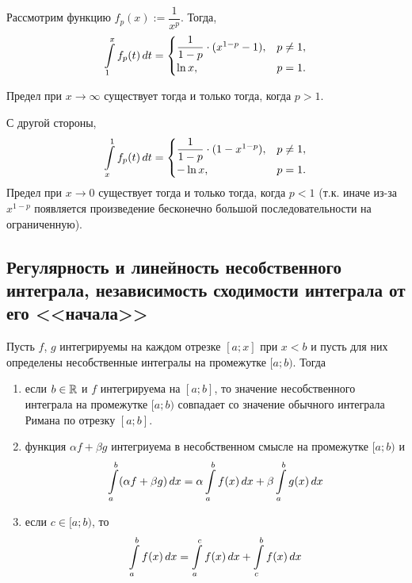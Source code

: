 \documentclass[a4paper]{article}
\theoremstyle{named}
\renewcommand{\int}{\intop}
\begin{document}
    	Рассмотрим функцию $f_p(x) := \dfrac{1}{x^p}$. Тогда,
    	\begin{equation*}
    		\int_1^x f_p(t) \dd t = \begin{cases}
    			\dfrac{1}{1 - p} \cdot (x^{1 - p} - 1), &p \neq 1, \\
    			\ln x, &p = 1.
    		\end{cases}
    	\end{equation*}

    	Предел при $x \to \infty$ существует тогда и только тогда, когда $p > 1$.

    	С другой стороны,
    	\begin{equation*}
    		\int_x^1 f_p(t) \dd t = \begin{cases}
    			\dfrac{1}{1 - p} \cdot (1 - x^{1 - p}), &p \neq 1, \\
    			-\ln x, &p = 1.
    		\end{cases}
    	\end{equation*}
    	Предел при $x \to 0$ существует тогда и только тогда, когда $p < 1$ (т.к. иначе из-за $x^{1 - p}$ появляется произведение бесконечно большой последовательности на ограниченную).

    	\subsection{Регулярность и линейность несобственного интеграла, независимость сходимости интеграла от его <<начала>>}

    	\begin{theorem*}
    		Пусть $f$, $g$ интегрируемы на каждом отрезке $[a; x]$ при $x < b$ и пусть для них определены несобственные интегралы на промежутке $[a; b)$. Тогда
    		\begin{enumerate}
    		\item
    			если $b \in \mathbb{R}$ и $f$ интегрируема на $[a; b]$, то значение несобственного интеграла на промежутке $[a; b)$ совпадает со значение обычного интеграла Римана по отрезку $[a; b]$.

    		\item
    			функция $\alpha f + \beta g$ интегриуема в несобственном смысле на промежутке $[a; b)$ и
    			\begin{equation*}
    				\int_a^b (\alpha f + \beta g) \dd x = \alpha \int_a^b f(x) \dd x + \beta \int_a^b g(x) \dd x
    			\end{equation*}

    		\item
    			если $c \in [a; b)$, то
    			\begin{equation*}
    				\int_a^b f(x) \dd x = \int_a^c f(x) \dd x + \int_c^b f(x) \dd x
    			\end{equation*}
    		\end{enumerate}
    	\end{theorem*}
\end{document}
